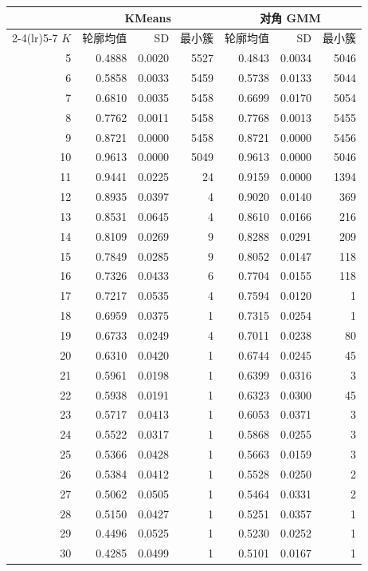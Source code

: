 \begin{tabular}{rrrrrrr}\toprule
&\multicolumn{3}{c}{KMeans}&\multicolumn{3}{c}{对角 GMM}\\
\cmidrule(lr){2-4}\cmidrule(lr){5-7}
$K$ & 轮廓均值 & SD & 最小簇 & 轮廓均值 & SD & 最小簇\\\midrule
5 & 0.4888 & 0.0020 & 5527 & 0.4843 & 0.0034 & 5046 \\
6 & 0.5858 & 0.0033 & 5459 & 0.5738 & 0.0133 & 5044 \\
7 & 0.6810 & 0.0035 & 5458 & 0.6699 & 0.0170 & 5054 \\
8 & 0.7762 & 0.0011 & 5458 & 0.7768 & 0.0013 & 5455 \\
9 & 0.8721 & 0.0000 & 5458 & 0.8721 & 0.0000 & 5456 \\
10 & 0.9613 & 0.0000 & 5049 & 0.9613 & 0.0000 & 5046 \\
11 & 0.9441 & 0.0225 & 24 & 0.9159 & 0.0000 & 1394 \\
12 & 0.8935 & 0.0397 & 4 & 0.9020 & 0.0140 & 369 \\
13 & 0.8531 & 0.0645 & 4 & 0.8610 & 0.0166 & 216 \\
14 & 0.8109 & 0.0269 & 9 & 0.8288 & 0.0291 & 209 \\
15 & 0.7849 & 0.0285 & 9 & 0.8052 & 0.0147 & 118 \\
16 & 0.7326 & 0.0433 & 6 & 0.7704 & 0.0155 & 118 \\
17 & 0.7217 & 0.0535 & 4 & 0.7594 & 0.0120 & 1 \\
18 & 0.6959 & 0.0375 & 1 & 0.7315 & 0.0254 & 1 \\
19 & 0.6733 & 0.0249 & 4 & 0.7011 & 0.0238 & 80 \\
20 & 0.6310 & 0.0420 & 1 & 0.6744 & 0.0245 & 45 \\
21 & 0.5961 & 0.0198 & 1 & 0.6399 & 0.0316 & 3 \\
22 & 0.5938 & 0.0191 & 1 & 0.6323 & 0.0300 & 45 \\
23 & 0.5717 & 0.0413 & 1 & 0.6053 & 0.0371 & 3 \\
24 & 0.5522 & 0.0317 & 1 & 0.5868 & 0.0255 & 3 \\
25 & 0.5366 & 0.0428 & 1 & 0.5663 & 0.0159 & 3 \\
26 & 0.5384 & 0.0412 & 1 & 0.5528 & 0.0250 & 2 \\
27 & 0.5062 & 0.0505 & 1 & 0.5464 & 0.0331 & 2 \\
28 & 0.5150 & 0.0427 & 1 & 0.5251 & 0.0357 & 1 \\
29 & 0.4496 & 0.0525 & 1 & 0.5230 & 0.0252 & 1 \\
30 & 0.4285 & 0.0499 & 1 & 0.5101 & 0.0167 & 1 \\
\bottomrule\end{tabular}
